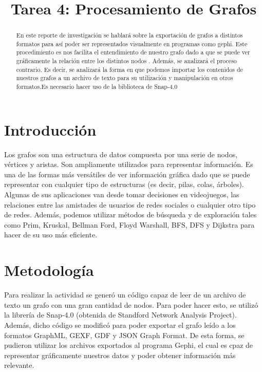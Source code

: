 \documentclass[conference]{IEEEtran}
\begin{document}
\title{Tarea 4: Procesamiento de Grafos}
\author
{
}
\maketitle

\begin{abstract}
En este reporte de investigación se hablará sobre la exportación de grafos a distintos formatos para así poder ser representados visualmente en programas como gephi. Este procedimiento es nos facilita el entendimiento de nuestro grafo dado a que se puede ver gráficamente la relación entre los distintos nodos . Además, se analizará el proceso contrario. Es decir, se analizará la forma en que podemos importar los contenidos de nuestros grafos a un archivo de texto para su utilización y manipulación en otros formatos.Es necesario hacer uso de la biblioteca de Snap-4.0
\end{abstract}

\section{Introducción}
Los grafos son una estructura de datos compuesta por una serie de nodos, vértices y aristas. Son ampliamente utilizados para representar información. Es una de las formas más versátiles de ver información gráfica dado que se puede representar con cualquier tipo de estructuras (es decir, pilas, colas, árboles). Algunas de sus aplicaciones van desde tomar decisiones en videojuegos, las relaciones entre las amistades de usuarios de redes sociales o cualquier otro tipo de redes. Además,  podemos utilizar métodos de búsqueda y de exploración tales como Prim, Kruskal, Bellman Ford, Floyd Warshall, BFS, DFS y Dijkstra para hacer de su uso más eficiente.

\section{Metodología}
Para realizar la actividad se generó un código capaz de leer de un archivo de texto un grafo con una gran cantidad de nodos. Para poder hacer esto, se utilizó la librería de Snap-4.0 (obtenida de Standford Network Analysis Project). Además, dicho código se modificó para poder exportar el grafo leído a los formatos GraphML, GEXF, GDF y JSON Graph Format. De esta forma, se pudieron utilizar los archivos exportados al programa Gephi, el cual es cpaz de representar gráficamente nuestros datos y poder obtener información más relevante.
\end{document}
